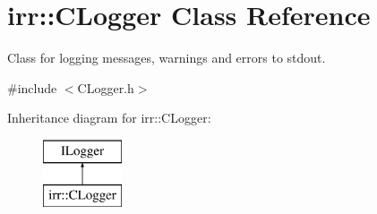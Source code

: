 \hypertarget{classirr_1_1_c_logger}{\section{irr\-:\-:C\-Logger Class Reference}
\label{classirr_1_1_c_logger}
}


Class for logging messages, warnings and errors to stdout.  




{\ttfamily \#include $<$C\-Logger.\-h$>$}

Inheritance diagram for irr\-:\-:C\-Logger\-:\begin{figure}[H]
\begin{center}
\leavevmode
\includegraphics[height=2.000000cm]{classirr_1_1_c_logger}
\end{center}
\end{figure}
